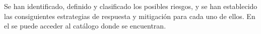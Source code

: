 Se han identificado, definido y clasificado los posibles riesgos, y se han establecido las consiguientes estrategias de respuesta y mitigación para cada uno de ellos.
En el  se puede acceder al catálogo donde se encuentran.
